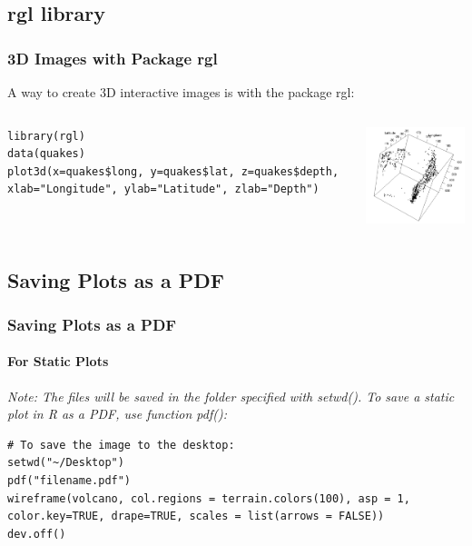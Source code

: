 \subsection{\ttfamily rgl \normalfont library} 
\begin{frame}[fragile]
\frametitle{3D Images with Package \ttfamily rgl \normalfont}

A way to create 3D interactive images is with the package \ttfamily rgl: \normalfont 

    \begin{columns}
\begin{lstlisting}
library(rgl)
data(quakes)
plot3d(x=quakes$long, y=quakes$lat, z=quakes$depth, xlab="Longitude", ylab="Latitude", zlab="Depth")
\end{lstlisting}

       \begin{center}
\includegraphics[width = 55mm]{images/Fiji_RGL}
\end{center}
\end{columns}
\end{frame}

\subsection{Saving Plots as a PDF} 
\begin{frame}[fragile]
\frametitle{Saving Plots as a PDF}
\framesubtitle{For Static Plots}

\itshape Note: \normalfont The files will be saved in the folder specified with \ttfamily setwd(). \normalfont
To save a static plot in \ttfamily R \normalfont as a PDF, use function \ttfamily pdf(): \normalfont

\begin{lstlisting}
# To save the image to the desktop:
setwd("~/Desktop")
pdf("filename.pdf")
wireframe(volcano, col.regions = terrain.colors(100), asp = 1, color.key=TRUE, drape=TRUE, scales = list(arrows = FALSE))
dev.off()
\end{lstlisting}

\end{frame}

